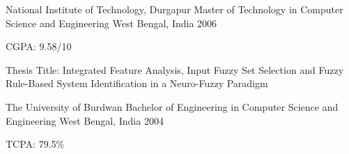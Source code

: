 

\begin{cventries}

  \cventry
    {National Institute of Technology, Durgapur} %
    {Master of Technology in Computer Science and Engineering} %
    {West Bengal, India} %
    {2006} %
    {
      \begin{cvitems} %
        \item {CGPA: 9.58/10} %
        \item {Thesis Title: Integrated Feature Analysis, Input Fuzzy Set Selection and Fuzzy Rule-Based System Identification in a Neuro-Fuzzy Paradigm} %
      \end{cvitems}
    }

  \cventry
    {The University of Burdwan} %
    {Bachelor of Engineering in Computer Science and Engineering} %
    {West Bengal, India} %
    {2004} %
    {
      \begin{cvitems} %
        \item {TCPA: 79.5\%} %
      \end{cvitems}
    }
  \begin{comment}
  \cventry
    {Higher Secondary, West Bengal Council of Higher Secondary Education} %
    {Burnpur Boys' High School} %
    {West Bengal, India} %
    {2000} %
    {
      \begin{cvitems} %
        \item {Science Major, 79.4\%} %
      \end{cvitems}
    }

  \cventry
    {Secondary, West Bengal Board of Secondary Education} %
    {Asansol Ramakrishna Mission High School} %
    {West Bengal, India} %
    {1998} %
    {
      \begin{cvitems} %
        \item {82\%} %
      \end{cvitems}
    }
  \end{comment}

\end{cventries}
